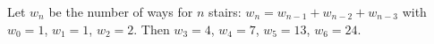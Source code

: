 Let $w_n$ be the number of ways for $n$ stairs: $w_n=w_{n-1}+w_{n-2}+w_{n-3}$ with $w_0=1$, $w_1=1$, $w_2=2$. Then $w_3=4$, $w_4=7$, $w_5=13$, $w_6=\boxed{24}$.
